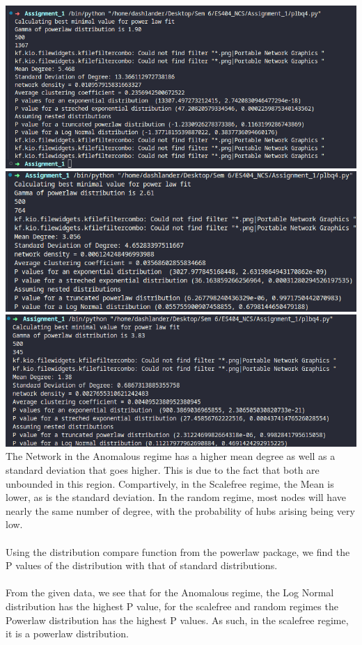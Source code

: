\documentclass[11pt]{article}
\begin{document}
\includegraphics[scale=0.7]{statsanam.png}\\
\includegraphics[scale=0.7]{statssf.png}\\
\includegraphics[scale=0.7]{statsrand.png}\\
The Network in the Anomalous regime has a higher mean degree as well as a standard deviation that goes higher. This is due to the fact that both are unbounded in this region. Compartively, in the Scalefree regime, the Mean is lower, as is the standard deviation. In the random regime, most nodes will have nearly the same number of degree, with the probability of hubs arising being very low.\\ \\
Using the distribution compare function from the powerlaw package, we find the P values of the distribution with that of standard distributions.\\ \\
From the given data, we see that for the Anomalous regime, the Log Normal distribution has the highest P value, for the scalefree and random regimes the Powerlaw distribution has the highest P values. As such, in the scalefree regime, it is a powerlaw distribution.
\end{document}
